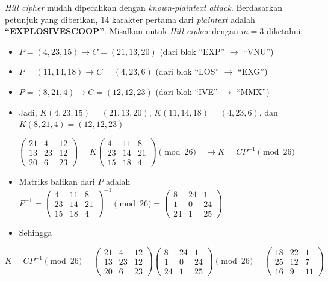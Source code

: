 \textit{Hill cipher} mudah dipecahkan dengan \textit{known-plaintext attack}.
Berdasarkan petunjuk yang diberikan, 14 karakter pertama dari \textit{plaintext} adalah \textbf{``EXPLOSIVESCOOP''}. 
Misalkan untuk \textit{Hill cipher} dengan $m = 3$ diketahui:
\begin{itemize}[nosep]
    \item $P = (4, 23, 15) \to C = (21, 13, 20)$ (dari blok ``EXP'' $\to$ ``VNU'')
    \item $P = (11, 14, 18) \to C = (4, 23, 6)$ (dari blok ``LOS'' $\to$ ``EXG'')
    \item $P = (8, 21, 4) \to C = (12, 12, 23)$ (dari blok ``IVE'' $\to$ ``MMX'')
    \item Jadi, $K(4, 23, 15) = (21, 13, 20)$, $K(11, 14, 18) = (4, 23, 6)$, dan $K(8, 21, 4) = (12, 12, 23)$
\end{itemize}

\begin{equation*}
\begin{pmatrix} 21 & 4 & 12 \\ 13 & 23 & 12 \\ 20 & 6 & 23 \end{pmatrix}
= K
\begin{pmatrix} 4 & 11 & 8 \\ 23 & 14 & 21 \\ 15 & 18 & 4 \end{pmatrix} \pmod{26}
\quad \to K = C P^{-1} \pmod{26}
\end{equation*}

\begin{itemize}[nosep]
    \item Matriks balikan dari $P$ adalah $P^{-1} = \begin{pmatrix} 4 & 11 & 8 \\ 23 & 14 & 21 \\ 15 & 18 & 4 \end{pmatrix}^{-1} \pmod{26} = \begin{pmatrix} 8 & 24 & 1 \\ 1 & 0 & 24 \\ 24 & 1 & 25 \end{pmatrix}$
    \item Sehingga
\end{itemize}

\begin{equation*}
K = C P^{-1} \pmod{26} = 
\begin{pmatrix} 21 & 4 & 12 \\ 13 & 23 & 12 \\ 20 & 6 & 23 \end{pmatrix}
\begin{pmatrix} 8 & 24 & 1 \\ 1 & 0 & 24 \\ 24 & 1 & 25 \end{pmatrix} \pmod{26}
= \begin{pmatrix} 18 & 22 & 1 \\ 25 & 12 & 7 \\ 16 & 9 & 11 \end{pmatrix}
\end{equation*}

